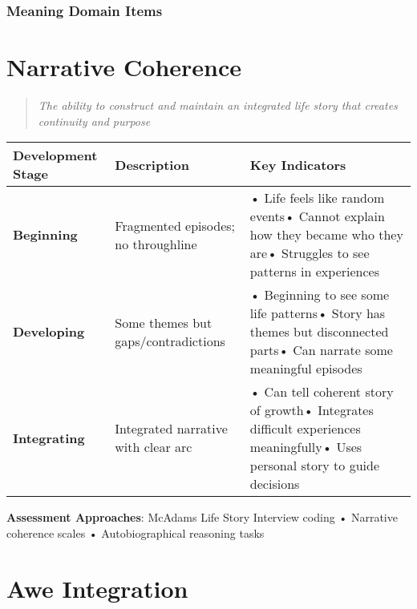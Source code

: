\documentclass[
  a4paper,
]{report}
\begin{document}
\subsubsection{Meaning Domain Items}\label{meaning-domain-items}

\section{Narrative Coherence}

\begin{quote}
\emph{The ability to construct and maintain an integrated life story
that creates continuity and purpose}
\end{quote}

\begin{longtable}[]{@{}
  >{\raggedright\arraybackslash}p{}
  >{\raggedright\arraybackslash}p{}
  >{\raggedright\arraybackslash}p{}@{}}
\toprule\noalign{}
\begin{minipage}[b]{\linewidth}\raggedright
Development Stage
\end{minipage} & \begin{minipage}[b]{\linewidth}\raggedright
Description
\end{minipage} & \begin{minipage}[b]{\linewidth}\raggedright
Key Indicators
\end{minipage} \\
\midrule\noalign{}
\endhead
\bottomrule\noalign{}
\endlastfoot
\textbf{Beginning} & Fragmented episodes; no throughline & • Life feels
like random events• Cannot explain how they became who they are•
Struggles to see patterns in experiences \\
\textbf{Developing} & Some themes but gaps/contradictions & • Beginning
to see some life patterns• Story has themes but disconnected parts• Can
narrate some meaningful episodes \\
\textbf{Integrating} & Integrated narrative with clear arc & • Can tell
coherent story of growth• Integrates difficult experiences meaningfully•
Uses personal story to guide decisions \\
\end{longtable}

\textbf{Assessment Approaches}: McAdams Life Story Interview coding •
Narrative coherence scales • Autobiographical reasoning tasks

\section{Awe Integration}
\end{document}
